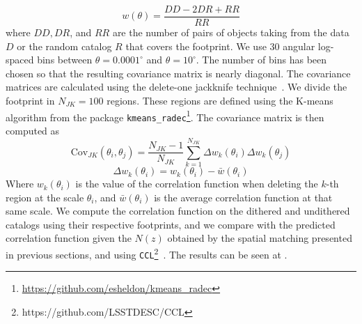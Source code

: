 \documentclass[\docopts]{\docclass}
\begin{document}
\begin{equation}
w(\theta) = \frac{DD - 2 DR + RR}{RR}
\end{equation} 
where $DD, DR$, and $RR$ are the number of pairs of objects taking from the data $D$ or the random catalog $R$ that covers the footprint. We use 30 angular log-spaced bins between $\theta=0.0001^{\circ}$ and $\theta=10^{\circ}$. The number of bins has been chosen so that the resulting covariance matrix is nearly diagonal. The covariance matrices are calculated using the delete-one jackknife technique~\citep{Shao:1986:DJB,2009MNRAS.396...19N}. We divide the footprint in $N_{JK}=100$ regions. These regions are defined using the K-means algorithm from the package \texttt{kmeans\_radec}\footnote{\url{https://github.com/esheldon/kmeans\_radec}}. The covariance matrix is then computed as
\begin{equation}
\mathrm{Cov}_{JK}(\theta_{i},\theta_{j})=\frac{N_{JK}-1}{N_{JK}}\sum_{k=1}^{N_{JK}}\Delta w_{k}(\theta_{i}) \Delta w_{k}(\theta_{j})
\end{equation}
\begin{equation}
\Delta w_{k}(\theta_{i}) = w_{k}(\theta_{i})-\bar{w}(\theta_{i})
\end{equation}
Where $w_{k}(\theta_{i})$ is the value of the correlation function when deleting the $k$-th region at the scale $\theta_{i}$, and $\bar{w}(\theta_{i})$ is the average correlation function at that same scale. We compute the correlation function on the dithered and undithered catalogs using their respective footprints, and we compare with the predicted correlation function given the $N(z)$ obtained by the spatial matching presented in previous sections, and using \texttt{CCL}\footnote{https://github.com/LSSTDESC/CCL}~\citep{CCL}. The results can be seen at . 
\end{document}
